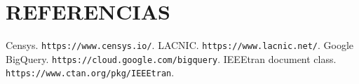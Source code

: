 \section{REFERENCIAS}
\begin{thebibliography}{9}
   Censys. \texttt{https://www.censys.io/}.
   LACNIC. \texttt{https://www.lacnic.net/}.
   Google BigQuery. \texttt{https://cloud.google.com/bigquery}.
   IEEEtran document class. \texttt{https://www.ctan.org/pkg/IEEEtran}.
\end{thebibliography}
